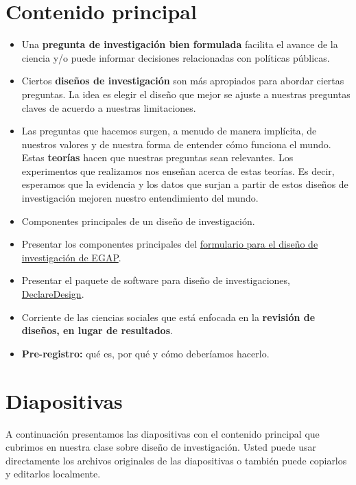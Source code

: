 \documentclass[
  12pt,
  spanish,
]{book}
\begin{document}
\hypertarget{contenido-principal}{%
\section{Contenido principal}\label{contenido-principal}}

\begin{itemize}
\item
  Una \textbf{pregunta de investigación bien formulada} facilita el avance de la ciencia y/o puede informar decisiones relacionadas con políticas públicas.
\item
  Ciertos \textbf{diseños de investigación} son más apropiados para abordar ciertas preguntas. La idea es elegir el diseño que mejor se ajuste a nuestras preguntas claves de acuerdo a nuestras limitaciones.
\item
  Las preguntas que hacemos surgen, a menudo de manera implícita, de nuestros valores y de nuestra forma de entender cómo funciona el mundo. Estas \textbf{teorías} hacen que nuestras preguntas sean relevantes. Los experimentos que realizamos nos enseñan acerca de estas teorías. Es decir, esperamos que la evidencia y los datos que surjan a partir de estos diseños de investigación mejoren nuestro entendimiento del mundo.
\item
  Componentes principales de un diseño de investigación.
\item
  Presentar los componentes principales del \href{https://egap.github.io/learningdays-resources/Exercises/design-form.html}{formulario para el diseño de investigación de EGAP}.
\item
  Presentar el paquete de software para diseño de investigaciones, \href{http://declaredesign.org}{DeclareDesign}.
\item
  Corriente de las ciencias sociales que está enfocada en la \textbf{revisión de diseños, en lugar de resultados}.
\item
  \textbf{Pre-registro:} qué es, por qué y cómo deberíamos hacerlo.
\end{itemize}

\hypertarget{diapositivas}{%
\section{Diapositivas}\label{diapositivas}}

A continuación presentamos las diapositivas con el contenido principal que cubrimos en nuestra clase sobre diseño de investigación. Usted puede usar directamente los archivos originales de las diapositivas o también puede copiarlos y editarlos localmente.
\end{document}
